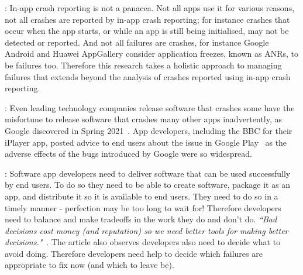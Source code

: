 : In-app crash reporting is not a panacea. Not all apps use it for various reasons, not all crashes are reported by in-app crash reporting; for instance crashes that occur when the app starts, or while an app is still being initialised, may not be detected or reported. And not all failures are crashes, for instance Google Android and Huawei AppGallery consider application freezes, known as ANRs, to be failures too. Therefore this research takes a holistic approach to managing failures that extends beyond the analysis of crashes reported using in-app crash reporting.   %

: Even leading technology companies release software that crashes some have the misfortune to release software that crashes many other apps inadvertently, as Google discovered in Spring 2021~\citep{bbcnews2021_google_fixes_crashing_android_app_issues}. App developers, including the BBC for their iPlayer app, posted advice to end users about the issue in Google Play~\citep{bbc_iplayer_app_april_2021_webview_information} as the adverse effects of the bugs introduced by Google were so widespread.


\medskip
{}: Software app developers need to deliver software that can be used successfully by end users. To do so they need to be able to create software, package it as an app, and distribute it so it is available to end users.
%
They need to do so in a timely manner - perfection may be too long to wait for! Therefore developers need to balance and make tradeoffs in the work they do and don't do. \emph{``Bad decisions cost money (and reputation) so we need better tools for making better decisions."}~\citep[p.115]{tantithamthavorn2021_actionable_analytics_tell_me_what_to_do}. The article also observes developers also need to decide what to avoid doing. Therefore developers need help to decide which failures are appropriate to fix now (and which to leave be).

